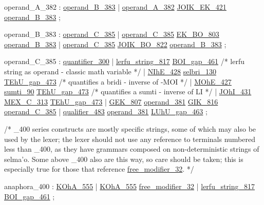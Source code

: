 \label{html:y382}
operand_A_382           :  \hyperref[html:y383]{operand_B_383}
                        |  \hyperref[html:y382]{operand_A_382}  \hyperref[html:y421]{JOIK_EK_421}  \hyperref[html:y383]{operand_B_383}
                        ;

\label{html:y383}
operand_B_383           :  \hyperref[html:y385]{operand_C_385}
                        |  \hyperref[html:y385]{operand_C_385}  \hyperref[html:y803]{EK_BO_803}  \hyperref[html:y383]{operand_B_383}
                        |  \hyperref[html:y385]{operand_C_385}  \hyperref[html:y822]{JOIK_BO_822}  \hyperref[html:y383]{operand_B_383}
                        ;

\label{html:y385}
operand_C_385           :  \hyperref[html:y300]{quantifier_300}
                        |  \hyperref[html:y817]{lerfu_string_817}  \hyperref[html:y461]{BOI_gap_461}
   /* lerfu string as operand - classic math variable */
                        |  \hyperref[html:y428]{NIhE_428}  \hyperref[html:y130]{selbri_130}  \hyperref[html:y473]{TEhU_gap_473}
   /* quantifies a bridi - inverse of -MOI */
                        |  \hyperref[html:y427]{MOhE_427}  \hyperref[html:y90]{sumti_90}  \hyperref[html:y473]{TEhU_gap_473}
   /* quantifies a sumti - inverse of LI */
                        |  \hyperref[html:y431]{JOhI_431}  \hyperref[html:y313]{MEX_C_313}  \hyperref[html:y473]{TEhU_gap_473}
                        |  \hyperref[html:y807]{GEK_807}  \hyperref[html:y381]{operand_381}  \hyperref[html:y816]{GIK_816}  \hyperref[html:y385]{operand_C_385}
                        |  \hyperref[html:y483]{qualifier_483}  \hyperref[html:y381]{operand_381}  \hyperref[html:y463]{LUhU_gap_463}
                        ;

/* _400 series constructs are mostly specific strings, some of which may
   also be used by the lexer; the lexer should not use any reference to
   terminals numbered less than _400, as they have grammars composed on
   non-deterministic strings of selma'o.  Some above _400 also are this
   way, so care should be taken; this is especially true for those that
   reference \hyperref[html:y32]{free_modifier_32}.  */

\label{html:y400}
anaphora_400            :  \hyperref[html:y555]{KOhA_555}
                        |  \hyperref[html:y555]{KOhA_555}  \hyperref[html:y32]{free_modifier_32}
                        |  \hyperref[html:y817]{lerfu_string_817}  \hyperref[html:y461]{BOI_gap_461}
                        ;


